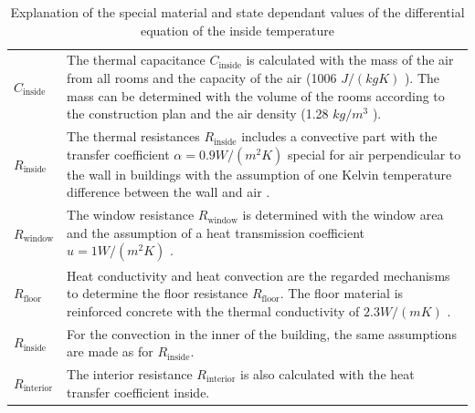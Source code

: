     \begin{table}[H]
        \centering
        \begin{tabular}{l p{13cm}}
            $C_\text{inside}$ & The thermal capacitance $C_\text{inside}$ is calculated with the mass of the air from all rooms and the capacity of the air (1006 $J/(kg K)$ \cite{Weigand.2016}). The mass can be determined with the volume of the rooms according to the construction plan \cite{Bauplan} and the air density (1.28 $kg/m^3$ \cite{Weigand.2016}).\\
            $R_\text{inside}$ & The thermal resistances $R_\text{inside}$ includes a convective part with the transfer coefficient $\alpha = 0.9 W/(m^2 K)$ special for air perpendicular to the wall in buildings with the assumption of one Kelvin temperature difference between the wall and air \cite{Schweizer-fnalpha}.\\
            $R_\text{window}$ & The window resistance $R_\text{window}$ is determined with the window area and the assumption of a heat transmission coefficient $u = 1 W/(m^2 K)$ \cite{ThorbenFrahm.2021}.\\
            $R_\text{floor}$ & Heat conductivity and heat convection are the regarded mechanisms to determine the floor resistance $R_\text{floor}$. The floor material is reinforced concrete with the thermal conductivity of $2.3 W/(m K)$ \cite{AntonSchweizer.12.10.2021}.\\
            $R_\text{inside}$ & For the convection in the inner of the building, the same assumptions are made as for $R_\text{inside}$.\\
            $R_\text{interior}$ & The interior resistance $R_\text{interior}$ is also calculated with the heat transfer coefficient inside.
        \end{tabular}
        \caption{Explanation of the special material and state dependant values of the differential equation of the inside temperature}
        \label{tab:valuesOfInsideTemperature}
    \end{table}
    
